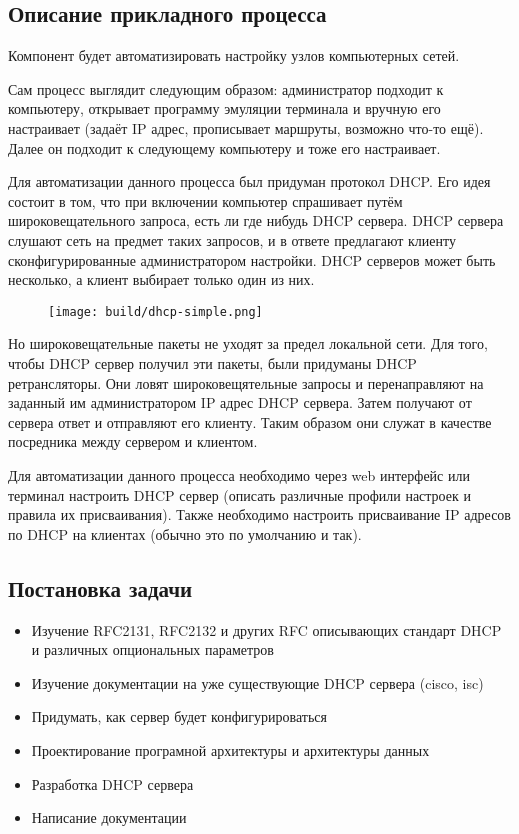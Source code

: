 \documentclass[12pt]{article}
\begin{document}
\subsection{Описание прикладного процесса}
Компонент будет автоматизировать настройку узлов компьютерных сетей.

Сам процесс выглядит следующим образом:
администратор подходит к компьютеру, открывает программу эмуляции терминала и вручную его настраивает (задаёт IP адрес, прописывает маршруты, возможно что-то ещё). Далее он подходит к следующему компьютеру и тоже его настраивает.

Для автоматизации данного процесса был придуман протокол DHCP.
Его идея состоит в том, что при включении компьютер спрашивает путём широковещательного запроса, есть ли где нибудь DHCP сервера.
DHCP сервера слушают сеть на предмет таких запросов, и в ответе предлагают клиенту сконфигурированные администратором настройки.
DHCP серверов может быть несколько, а клиент выбирает только один из них.

\begin{figure}[H]
    \texttt{[image: build/dhcp-simple.png]}
    \caption{}
\end{figure}

Но широковещательные пакеты не уходят за предел локальной сети.
Для того, чтобы DHCP сервер получил эти пакеты, были придуманы DHCP ретрансляторы.
Они ловят широковещятельные запросы и перенаправляют на заданный им администратором IP адрес DHCP сервера.
Затем получают от сервера ответ и отправляют его клиенту.
Таким образом они служат в качестве посредника между сервером и клиентом.

Для автоматизации данного процесса необходимо через web интерфейс или терминал настроить DHCP сервер (описать различные профили настроек и правила их присваивания). Также необходимо настроить присваивание IP адресов по DHCP на клиентах (обычно это по умолчанию и так).

\subsection{Постановка задачи}

\begin{itemize}
    \item Изучение RFC2131, RFC2132 и других RFC описывающих стандарт DHCP и различных опциональных параметров
    \item Изучение документации на уже существующие DHCP сервера (cisco, isc)
    \item Придумать, как сервер будет конфигурироваться
    \item Проектирование програмной архитектуры и архитектуры данных
    \item Разработка DHCP сервера
    \item Написание документации
\end{itemize}
\end{document}
